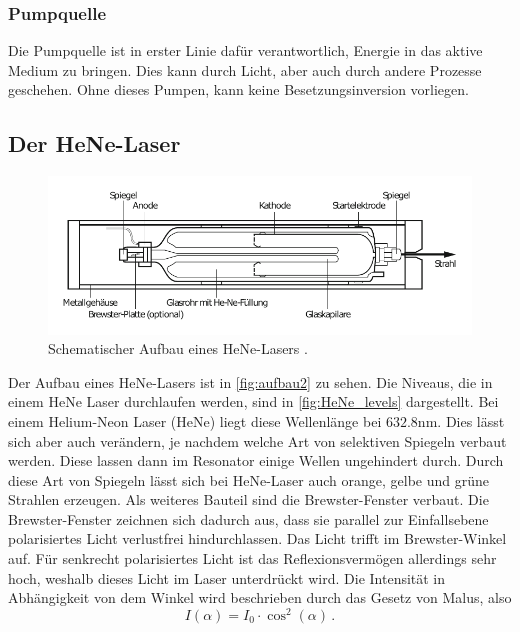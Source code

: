 \subsubsection*{Pumpquelle}
Die Pumpquelle ist in erster Linie dafür verantwortlich, Energie in das aktive Medium zu bringen.
Dies kann durch Licht, aber auch durch andere Prozesse geschehen.
Ohne dieses Pumpen, kann keine Besetzungsinversion vorliegen.

\subsection{Der HeNe-Laser}
\begin{figure}
    \centering
    \includegraphics[width = 0.7 \linewidth]{pictures/aufbau2.pdf}
    \caption{Schematischer Aufbau eines HeNe-Lasers \cite{laseraufbau}.}
    \label{fig:aufbau2}
\end{figure}
Der Aufbau eines HeNe-Lasers ist in \autoref{fig:aufbau2} zu sehen.
Die Niveaus, die in einem HeNe Laser durchlaufen werden, sind in \autoref{fig:HeNe_levels} dargestellt.
Bei einem Helium-Neon Laser (HeNe) liegt diese Wellenlänge bei $632.8 \unit{\nano\meter}$.
Dies lässt sich aber auch verändern, je nachdem welche Art von selektiven Spiegeln verbaut werden.
Diese lassen dann im Resonator einige Wellen ungehindert durch.
Durch diese Art von Spiegeln lässt sich bei HeNe-Laser auch orange, gelbe und grüne Strahlen erzeugen. 
Als weiteres Bauteil sind die Brewster-Fenster verbaut.
Die Brewster-Fenster zeichnen sich dadurch aus, dass sie parallel zur Einfallsebene polarisiertes Licht verlustfrei hindurchlassen.
Das Licht trifft im Brewster-Winkel auf.
Für senkrecht polarisiertes Licht ist das Reflexionsvermögen allerdings sehr hoch, weshalb dieses Licht im Laser unterdrückt wird.
Die Intensität in Abhängigkeit von dem Winkel wird beschrieben durch das Gesetz von Malus, also
\begin{equation} \label{eq:malus}
    I(\alpha) = I_0 \cdot \cos^2(\alpha) \, .
\end{equation}